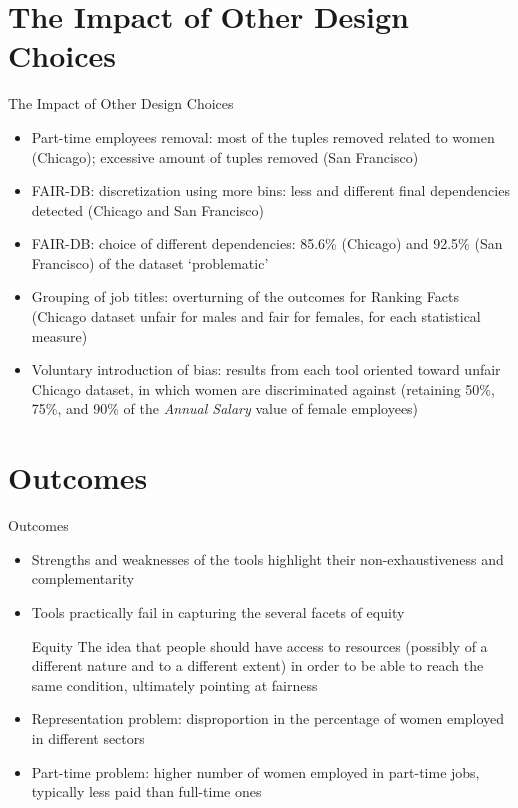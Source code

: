 \documentclass[usenames,dvipsnames]{beamer}
\begin{document}
    \section[]{The Impact of Other Design Choices}
    \begin{frame}{The Impact of Other Design Choices}
        \begin{itemize}
            \item \textcolor{defaultBlue}{Part-time employees removal}: most of the tuples removed related to women (Chicago); excessive amount of tuples removed (San Francisco)
            \item \textcolor{defaultBlue}{FAIR-DB: discretization using more bins}: less and different final dependencies detected (Chicago and San Francisco)
            \item \textcolor{defaultBlue}{FAIR-DB: choice of different dependencies}: 85.6\% (Chicago) and 92.5\% (San Francisco) of the dataset `problematic'
            \item \textcolor{defaultBlue}{Grouping of job titles}: overturning of the outcomes for Ranking Facts (Chicago dataset unfair for males and fair for females, for each statistical measure)
            \item \textcolor{defaultBlue}{Voluntary introduction of bias}: results from each tool oriented toward unfair Chicago dataset, in which women are discriminated against (retaining 50\%, 75\%, and 90\% of the \textit{Annual Salary} value of female employees)
        \end{itemize}
    \end{frame}
    
    
    \section[]{Outcomes}
    \begin{frame}{Outcomes}
        \begin{itemize}
            \item Strengths and weaknesses of the tools highlight their non-exhaustiveness and complementarity
            \item Tools practically fail in capturing the several facets of \alert{equity}
            \begin{block}{Equity}
                The idea that people should have access to resources (possibly of a different nature and to a different extent) in order to be able to reach the same condition, ultimately pointing at fairness
            \end{block}
            \item \textcolor{defaultBlue}{Representation problem}: disproportion in the percentage of women employed in different sectors
            \item \textcolor{defaultBlue}{Part-time problem}: higher number of women employed in part-time jobs, typically less paid than full-time ones
        \end{itemize}
    \end{frame}
    
\end{document}
